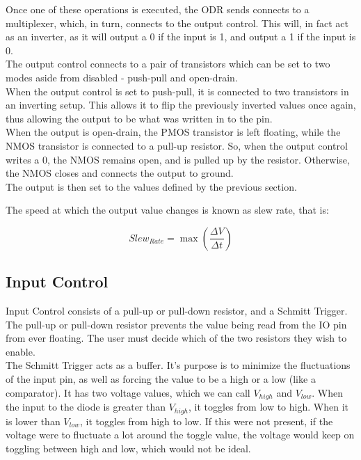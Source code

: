 \documentclass[nobib]{tufte-handout}
\begin{document}
Once one of these operations is executed, the ODR sends connects to a
multiplexer, which, in turn, connects to the output control. This will, in fact
act as an inverter, as it will output a 0 if the input is 1, and output a 1 if
the input is 0.\\

The output control connects to a pair of transistors which can be set to two
modes aside from disabled - push-pull and open-drain.\\ When the output control
is set to push-pull, it is connected to two transistors in an inverting setup.
This allows it to flip the previously inverted values once again, thus allowing
the output to be what was written in to the pin.\\ When the output is
open-drain, the PMOS transistor is left floating, while the NMOS transistor is
connected to a pull-up resistor. So, when the output control writes a 0, the
NMOS remains open, and is pulled up by the resistor. Otherwise, the NMOS closes
and connects the output to ground.\\ The output is then set to the values
defined by the previous section.

The speed at which the output value changes is known as slew rate, that is:

\begin{equation*}
    Slew_{Rate} = \max(\frac{\Delta V}{\Delta t})
\end{equation*}

\subsection{Input Control}
Input Control consists of a pull-up or pull-down resistor, and a Schmitt
Trigger. The pull-up or pull-down resistor prevents the value being read from
the IO pin from ever floating. The user must decide which of the two resistors
they wish to enable.\\ The Schmitt Trigger acts as a buffer. It's purpose is to
minimize the fluctuations of the input pin, as well as forcing the value to be
a high or a low (like a comparator). It has two voltage values, which we can
call $V_{high}$ and $V_{low}$. When the input to the diode is greater than
$V_{high}$, it toggles from low to high. When it is lower than $V_{low}$, it
toggles from high to low. If this were not present, if the voltage were to
fluctuate a lot around the toggle value, the voltage would keep on toggling
between high and low, which would not be ideal.\\
\end{document}
